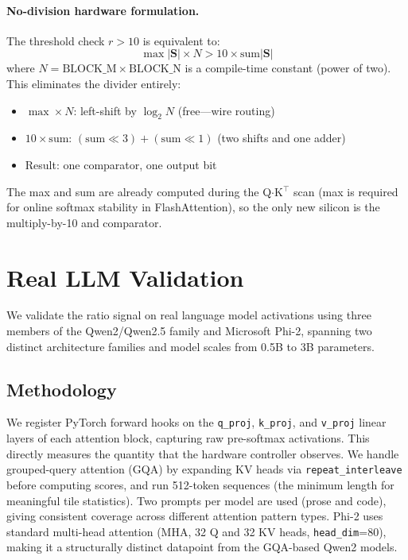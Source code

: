 \documentclass[10pt,twocolumn]{article}
\begin{document}
\paragraph{No-division hardware formulation.}
The threshold check $r > 10$ is equivalent to:
\[
\max|\mathbf{S}| \times N > 10 \times \mathrm{sum}|\mathbf{S}|
\]
where $N = \mathrm{BLOCK\_M} \times \mathrm{BLOCK\_N}$ is a
compile-time constant (power of two). This eliminates the divider
entirely:
\begin{itemize}
  \item $\max \times N$: left-shift by $\log_2 N$ (free---wire routing)
  \item $10 \times \mathrm{sum}$: $(\mathrm{sum} \ll 3) + (\mathrm{sum} \ll 1)$
  (two shifts and one adder)
  \item Result: one comparator, one output bit
\end{itemize}
The max and sum are already computed during the Q$\cdot$K$^\top$ scan
(max is required for online softmax stability in FlashAttention), so
the only new silicon is the multiply-by-10 and comparator.

\section{Real LLM Validation}
\label{sec:real_llm}

We validate the ratio signal on real language model activations using
three members of the Qwen2/Qwen2.5 family and Microsoft Phi-2, spanning
two distinct architecture families and model scales from 0.5B to 3B parameters.

\subsection{Methodology}

We register PyTorch forward hooks on the \texttt{q\_proj},
\texttt{k\_proj}, and \texttt{v\_proj} linear layers of each attention
block, capturing raw pre-softmax activations. This directly measures the
quantity that the hardware controller observes. We handle grouped-query
attention (GQA) by expanding KV heads via \texttt{repeat\_interleave}
before computing scores, and run 512-token sequences (the minimum length
for meaningful tile statistics). Two prompts per model are used (prose
and code), giving consistent coverage across different attention pattern
types. Phi-2 uses standard multi-head attention (MHA, 32 Q and 32 KV
heads, \texttt{head\_dim}=80), making it a structurally distinct
datapoint from the GQA-based Qwen2 models.
\end{document}
